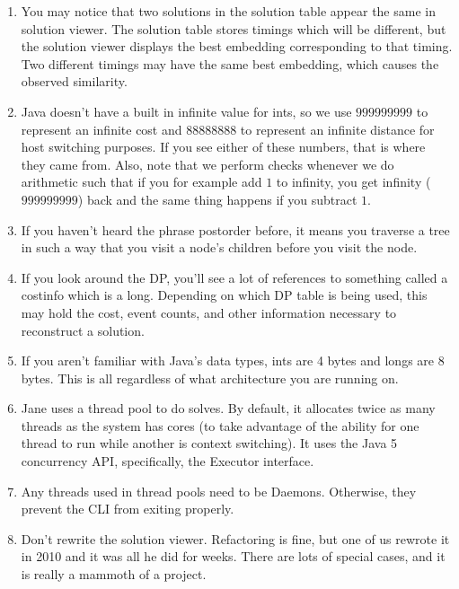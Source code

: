\documentclass{article}
\begin{document}
\begin{enumerate}
\item You may notice that two solutions in the solution table appear the same in solution viewer. The solution table stores timings which will be different, but the solution viewer displays the best embedding corresponding to that timing. Two different timings may have the same best embedding, which causes the observed similarity.

\item Java doesn't have a built in infinite value for ints, so we use $999999999$ to represent an infinite cost and $88888888$ to represent an infinite distance for host switching purposes. If you see either of these numbers, that is where they came from. Also, note that we perform checks whenever we do arithmetic such that if you for example add $1$ to infinity, you get infinity ($999999999$) back and the same thing happens if you subtract $1$.

\item If you haven't heard the phrase postorder before, it means you traverse a tree in such a way that you visit a node's children before you visit the node.

\item If you look around the DP, you'll see a lot of references to something called a costinfo which is a long. Depending on which DP table is being used, this may hold the cost, event counts, and other information necessary to reconstruct a solution.

\item If you aren't familiar with Java's data types, ints are 4 bytes and longs are 8 bytes. This is all regardless of what architecture you are running on.

\item Jane uses a thread pool to do solves. By default, it allocates twice as many threads as the system has cores (to take advantage of the ability for one thread to run while another is context switching). It uses the Java 5 concurrency API, specifically, the Executor interface.

\item Any threads used in thread pools need to be Daemons. Otherwise, they prevent the CLI from exiting properly.

\item Don't rewrite the solution viewer. Refactoring is fine, but one of us rewrote it in 2010 and it was all he did for weeks. There are lots of special cases, and it is really a mammoth of a project.
\end{enumerate}
\end{document}
